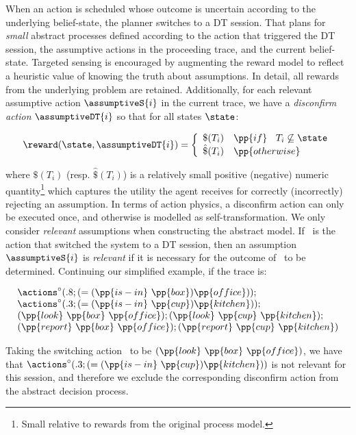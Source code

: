 When an action is scheduled whose outcome is uncertain according to
the underlying belief-state, the planner switches to a DT
session. That plans for {\em small} abstract processes defined
according to the action that triggered the DT session, the assumptive
actions in the proceeding trace, and the current
belief-state. Targeted sensing is encouraged by augmenting the reward
model to reflect a heuristic value of knowing the truth about
assumptions. In detail, all rewards from the underlying problem are
retained. Additionally, for each relevant assumptive action
$\assumptiveS{i}$ in the current trace, we have a {\em disconfirm
action} $\assumptiveDT{i}$ so that for all states $\state$:

\small
\[
\reward(\state, \assumptiveDT{i}) = \bigg\{ \begin{array}{ll}
\$(T_i) & \pp{if}~\;\;T_i \not\subseteq \state \\
\hat\$(T_i) & \pp{otherwise} \\
\end{array}
\]
\normalsize

\noindent where $\$(T_i)$ (resp. $\hat\$(T_i)$) is a 
relatively small positive (negative) numeric quantity\footnote{Small
relative to rewards from the original process model.} which captures
the utility the agent receives for correctly (incorrectly) rejecting
an assumption.
In terms of action physics, a disconfirm action can only be executed
once, and otherwise is modelled as self-transformation.
We only consider {\em relevant} assumptions when constructing the
abstract model.  If \switchAction\ is the action that switched the
system to a DT session, then an assumption $\assumptiveS{i}$ is {\em
relevant} if it is necessary for the outcome of \switchAction\ to be
determined.  Continuing our simplified example, if the trace is:

\small
\[
\begin{array}{l}
\actions^{\circ}(.8;(=(\pp{is-in}~\pp{box})\pp{office}));\\
\actions^{\circ}(.3;(=(\pp{is-in}~\pp{cup})\pp{kitchen}));\\
(\pp{look}~\pp{box}~\pp{office});
(\pp{look}~\pp{cup}~\pp{kitchen});\\
(\pp{report}~\pp{box}~\pp{office}); 
(\pp{report}~\pp{cup}~\pp{kitchen})
\end{array}
\]
\normalsize

\noindent Taking the switching action \switchAction\ to be
$(\pp{look}~\pp{box}~\pp{office})$, we have that
$\actions^{\circ}(.3;(=(\pp{is-in}~\pp{cup})\pp{kitchen}))$ is not
relevant for this session, and therefore we exclude the corresponding
disconfirm action from the abstract decision process.

